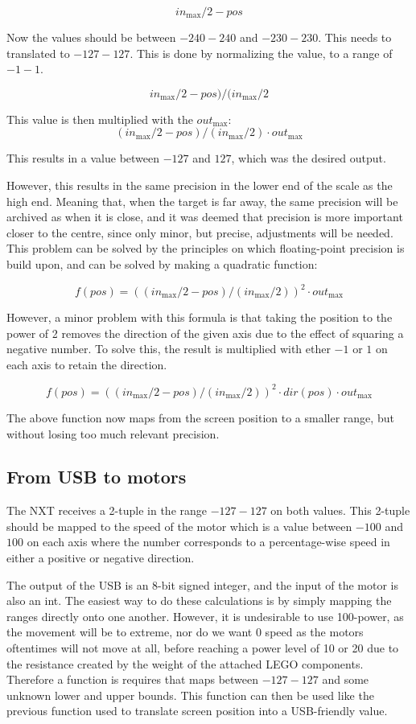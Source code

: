 $$
in_\text{max}/2 - pos
$$

Now the values should be between $-240 - 240$ and $-230 - 230$.
This needs to translated to $-127 - 127$.
This is done by normalizing the value, to a range of $-1 - 1$.

$$
in_\text{max}/2 - pos)/(in_\text{max}/2
$$


This value is then multiplied with the $out_\text{max}$:
$$
(in_\text{max}/2 - pos)/(in_\text{max}/2) \cdot out_\text{max}
$$

This results in a value between $-127$ and $127$, which was the desired output.


However, this results in the same precision in the lower end of the scale as the high end.
Meaning that, when the target is far away, the same precision will be archived as when it is close, and it was deemed that precision is more important closer to the centre, since only minor, but precise, adjustments will be needed.
This problem can be solved by the principles on which floating-point precision is build upon, and can be solved by making a quadratic function:

$$
f(pos) = ((in_\text{max}/2 - pos)/(in_\text{max}/2))^2 \cdot out_\text{max}
$$

However, a minor problem with this formula is that taking the position to the power of 2 removes the direction of the given axis due to the effect of squaring a negative number.
To solve this, the result is multiplied with ether $-1$ or $1$ on each axis to retain the direction.

$$
f(pos) = ((in_\text{max}/2 - pos)/(in_\text{max}/2))^2 \cdot dir(pos) \cdot out_\text{max}
$$

The above function now maps from the screen position to a smaller range, but without losing too much relevant precision.

\subsection{From USB to motors}
The NXT receives a 2-tuple in the range $-127 - 127$ on both values.
This 2-tuple should be mapped to the speed of the motor which is a value between $-100$ and $100$ on each axis where the number corresponds to a percentage-wise speed in either a positive or negative direction. 

The output of the USB is an 8-bit signed integer, and the input of the motor is also an int.
The easiest way to do these calculations is by simply mapping the ranges directly onto one another.
However, it is undesirable to use 100-power, as the movement will be to extreme, nor do we want 0 speed as the motors oftentimes will not move at all, before reaching a power level of 10 or 20 due to the resistance created by the weight of the attached LEGO components.
Therefore a function is requires that maps between $-127 - 127$ and some unknown lower and upper bounds.
This function can then be used like the previous function used to translate screen position into a USB-friendly value.

